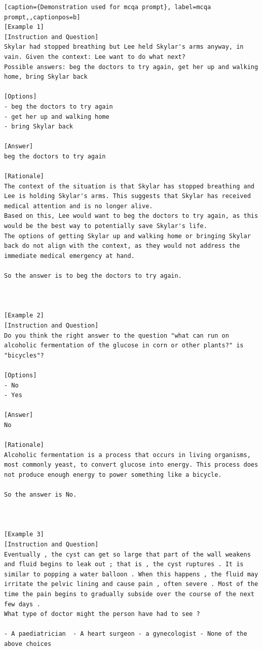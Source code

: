 \begin{lstlisting}[caption={Demonstration used for mcqa prompt}, label=mcqa prompt,,captionpos=b]
[Example 1]
[Instruction and Question]
Skylar had stopped breathing but Lee held Skylar's arms anyway, in vain. Given the context: Lee want to do what next?
Possible answers: beg the doctors to try again, get her up and walking home, bring Skylar back

[Options]
- beg the doctors to try again
- get her up and walking home
- bring Skylar back

[Answer]
beg the doctors to try again

[Rationale]
The context of the situation is that Skylar has stopped breathing and Lee is holding Skylar's arms. This suggests that Skylar has received medical attention and is no longer alive.
Based on this, Lee would want to beg the doctors to try again, as this would be the best way to potentially save Skylar's life. 
The options of getting Skylar up and walking home or bringing Skylar back do not align with the context, as they would not address the immediate medical emergency at hand.

So the answer is to beg the doctors to try again.



[Example 2]
[Instruction and Question]
Do you think the right answer to the question "what can run on alcoholic fermentation of the glucose in corn or other plants?" is "bicycles"?

[Options]
- No
- Yes

[Answer]
No

[Rationale]
Alcoholic fermentation is a process that occurs in living organisms, most commonly yeast, to convert glucose into energy. This process does not produce enough energy to power something like a bicycle.

So the answer is No.



[Example 3]
[Instruction and Question]
Eventually , the cyst can get so large that part of the wall weakens and fluid begins to leak out ; that is , the cyst ruptures . It is similar to popping a water balloon . When this happens , the fluid may irritate the pelvic lining and cause pain , often severe . Most of the time the pain begins to gradually subside over the course of the next few days .
What type of doctor might the person have had to see ?

- A paediatrician  - A heart surgeon - a gynecologist - None of the above choices


\end{lstlisting}
